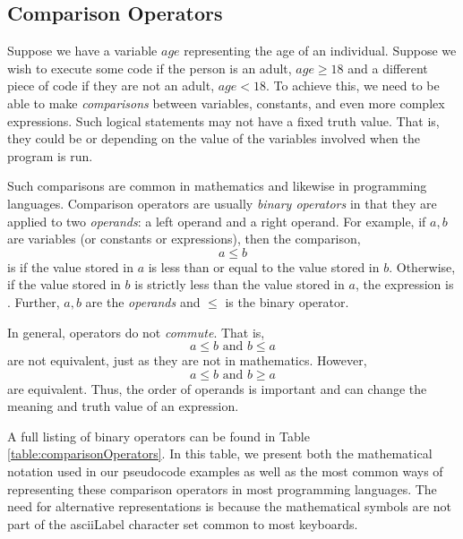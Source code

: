 \subsection{Comparison Operators}

Suppose we have a variable $age$ representing the age of an individual.  Suppose
we wish to execute some code if the person is an adult, $age \geq 18$ and a different
piece of code if they are not an adult, $age < 18$.  To achieve this, we need to be
able to make \emph{comparisons} between variables, constants, and even more 
complex expressions.  Such logical statements may not have a fixed truth value.  That
is, they could be \True or \False depending on the value of the variables involved 
when the program is run.  

Such comparisons are common in mathematics and likewise in programming languages.
Comparison operators are usually \emph{binary operators} in that they are applied
to two \emph{operands}: a left operand and a right operand.  For example, if $a, b$
are variables (or constants or expressions), then the comparison, 
  $$a \leq b$$
is \True if the value stored in $a$ is less than or equal to the value stored in $b$.  Otherwise, 
if the value stored in $b$ is strictly less than the value stored in $a$, the expression is
\False.  Further, $a, b$ are the \emph{operands} and $\leq$ is the binary operator.

In general, operators do not \emph{commute}.  That is, 
  $$a \leq b \textrm{ and } b \leq a$$
are not equivalent, just as they are not in mathematics.  However, 
  $$a \leq b \textrm{ and } b \geq a$$
are equivalent.  Thus, the order of operands is important and can change the 
meaning and truth value of an expression.

A full listing of binary operators can be found in Table 
\ref{table:comparisonOperators}. In this table, we present both the 
mathematical notation used in our pseudocode
examples as well as the most common ways of representing these comparison
operators in most programming languages.  The need for alternative representations
is because the mathematical symbols are not part of the \gls{asciiLabel} character set common
to most keyboards.  

